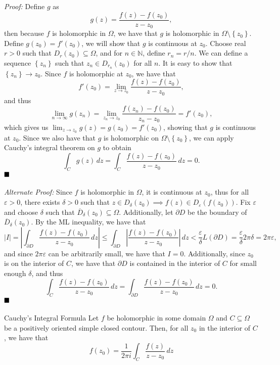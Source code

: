 \documentclass[12pt]{article}
\newcommand{\N}{\mathbb{N}}
\newcommand{\e}{\varepsilon}
\newcommand{\braceb}[1]{\left\{#1\right\}}
\newcommand{\vertb}[1]{\left\vert#1\right\vert}
\newcommand{\proof}{\textit{Proof: }}
\newcommand{\altproof}{\textit{Alternate Proof: }}
\newcommand{\done}{\ensuremath{\strut\hfill\blacksquare}}
\begin{document}
\proof
Define \( g \) as
\[
	g(z) = \frac{f(z) - f(z_0)}{z - z_0},
\]
then because \( f \) is holomorphic in \( \Omega \), we have that \( g \) is
holomorphic in \( \Omega \setminus \braceb{z_0} \).
Define \( g(z_0) = f'(z_0) \), we will show that \( g \) is continuous at
\( z_0 \).
Choose real \( r > 0 \) such that \( D_r(z_0) \subseteq \Omega \), and for
\( n \in \N \), define \( r_n = r / n \).
We can define a sequence \( \braceb{z_n} \) such that
\( z_n \in D_{r_n}(z_0) \) for all \( n \).
It is easy to show that \( \braceb{z_n} \to z_0 \).
Since \( f \) is holomorphic at \( z_0 \), we have that
\[
	f'(z_0)
	= \lim_{z \to z_0} \frac{f(z) - f(z_0)}{z - z_0},
\]
and thus
\[
	\lim_{n \to \infty} g(z_n)
	= \lim_{z_n \to z_0} \frac{f(z_n) - f(z_0)}{z_n - z_0}
	= f'(z_0),
\]
which gives us \( \lim_{z \to z_0} g(z) = g(z_0) = f'(z_0) \), showing that
\( g \) is continuous at \( z_0 \).
Since we also have that \( g \) is holomorphic on
\( \Omega \setminus \braceb{z_0} \), we can apply Cauchy's integral theorem on
\( g \) to obtain
\[
	\int_C g(z) \, dz
	= \int_C \frac{f(z) - f(z_0)}{z - z_0} \, dz
	= 0.
\]
\done

\altproof
Since \( f \) is holomorphic in \( \Omega \), it is continuous at \( z_0 \),
thus for all \( \e > 0 \), there exists \( \delta > 0 \) such that
\( z \in D_\delta(z_0) \implies f(z) \in D_\e(f(z_0)) \).
Fix \( \e \) and choose \( \delta \) such that
\( \overline{D}_\delta(z_0) \subseteq \Omega \).
Additionally, let \( \partial D \) be the boundary of
\( \overline{D}_\delta(z_0) \).
By the ML inequality, we have that
\[
	\vertb{I}
	= \vertb{\int_{\partial D} \frac{f(z) - f(z_0)}{z - z_0} \, dz}
	\leq \int_{\partial D} \vertb{\frac{f(z) - f(z_0)}{z - z_0}} \, dz
	< \frac{\e}{\delta}L(\partial D)
	= \frac{\e}{\delta}2\pi\delta
	= 2\pi\e,
\]
and since \( 2\pi\e \) can be arbitrarily small, we have that \( I = 0 \).
Additionally, since \( z_0 \) is on the interior of \( C \), we have that
\( \partial D \) is contained in the interior of \( C \) for small enough
\( \delta \), and thus
\[
	\int_{C} \frac{f(z) - f(z_0)}{z - z_0} \, dz
	= \int_{\partial D} \frac{f(z) - f(z_0)}{z - z_0} \, dz
	= 0.
\]
\done

\begin{theorem}{Cauchy's Integral Formula}{}
	Let \( f \) be holomorphic in some domain \( \Omega \) and
	\( C \subseteq \Omega \) be a positively oriented simple closed contour.
	Then, for all \( z_0 \) in the interior of \( C \), we have that
	\[
		f(z_0)
		= \frac{1}{2\pi i} \int_C \frac{f(z)}{z - z_0} \, dz
	\]
\end{theorem}
\end{document}
